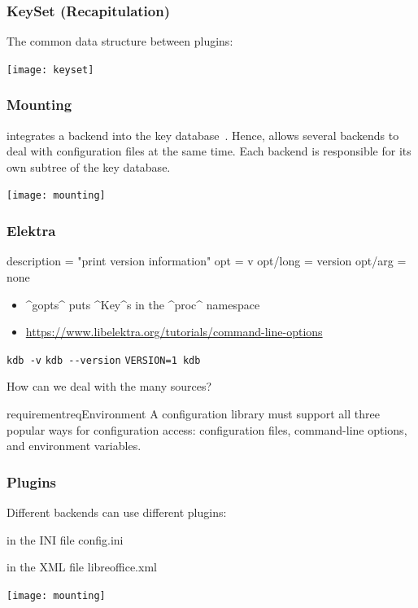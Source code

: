 \begin{frame}
	\frametitle{KeySet (Recapitulation)}

	The common data structure between plugins:
	\vspace{1cm}

	\texttt{[image: keyset]}
\end{frame}

\begin{frame}
	\frametitle{Mounting}
	 integrates a backend into the key database~\cite{raab2008thesis}.
	Hence, \elektra{} allows several backends to deal with configuration files at the same time.
	Each backend is responsible for its own subtree of the key database.

	\texttt{[image: mounting]}
\end{frame}

\begin{frame}[fragile]
	\frametitle{Elektra}

	\begin{code}
	description = "print version information"
	opt = v
	opt/long = version
	opt/arg = none
	\end{code}

	\begin{itemize}
	\item ^gopts^ puts ^Key^s in the ^proc^ namespace
	\item \url{https://www.libelektra.org/tutorials/command-line-options}
	\end{itemize}

	\verb^kdb -v^ \hspace{0.5cm} \verb^kdb --version^ \hspace{0.5cm} \verb^VERSION=1 kdb^
\end{frame}

\begin{frame}
	How can we deal with the many sources?

	\vspace{1cm}

	\begin{restatable}{requirement}{reqEnvironment}
	A configuration library must support all three popular ways for configuration access:
	configuration files, command-line options, and environment variables.
	\end{restatable}
\end{frame}

\begin{frame}
	\frametitle{Plugins}

	Different backends can use different plugins:
	\begin{description}[labelsep=10cm,align=right]
	\item[\texttt{/sw}] in the INI file config.ini
	\item[\texttt{/sw/libreoffice}] in the XML file libreoffice.xml
	\end{description}

	\texttt{[image: mounting]}
\end{frame}

